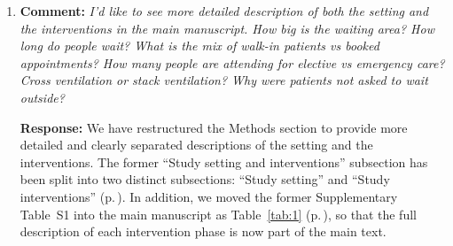 \documentclass[11pt]{article}
\newcommand{\comment}[1]{\textbf{Comment:} \textit{#1}}
\newcommand{\response}[1]{\textbf{Response:} #1}
\begin{document}
\begin{enumerate}[label=\textbf{R2.\arabic*.}, leftmargin=*]
{\begin{enumerate}
\item We expanded the Methods (Environmental monitoring subsection) to summarise both CO\textsubscript{2}-based estimation approaches (p.\,\pageref{chg:R2.11envmon}).
\item We updated Supplementary Text B to explicitly compare their respective assumptions about outdoor (replacement air) CO\textsubscript{2} concentrations.
\item We added a description of the waiting area dimensions (approximately 393\,m\textsuperscript{2}, volume 1,179\,m\textsuperscript{3}) to the Methods (Study setting subsection, p.\,\pageref{chg:R2.11setting}).
\item We added a paragraph to the Methods (Environmental monitoring subsection) describing the ventilation conditions (p.\,\pageref{chg:R2.3vent}).
\item We now report absolute ventilation rates (L/s) alongside air exchange rates in the Results section (p.\,\pageref{chg:R2.14}) and Table~\ref{tab:2} (p.\,\pageref{chg:R2.14tab}); see also our response to \ref{r:2.14}.
\item We added a paragraph to the Discussion acknowledging the limitations of not measuring outdoor CO\textsubscript{2} and airflow patterns (p.\,\pageref{chg:R2.27}; see also \ref{r:2.27}).
\end{enumerate}}

\item\label{r:2.12} \comment{I'd like to see more detailed description of both the setting and the interventions in the main manuscript. How big is the waiting area? How long do people wait? What is the mix of walk-in patients vs booked appointments? How many people are attending for elective vs emergency care? Cross ventilation or stack ventilation? Why were patients not asked to wait outside?}

\response{We have restructured the Methods section to provide more detailed and clearly separated descriptions of the setting and the interventions. The former ``Study setting and interventions'' subsection has been split into two distinct subsections: ``Study setting'' and ``Study interventions'' (p.\,\pageref{chg:R2.12}). In addition, we moved the former Supplementary Table~S1 into the main manuscript as Table~\ref{tab:1} (p.\,\pageref{tab:1}), so that the full description of each intervention phase is now part of the main text.

}
\end{enumerate}
\end{document}

